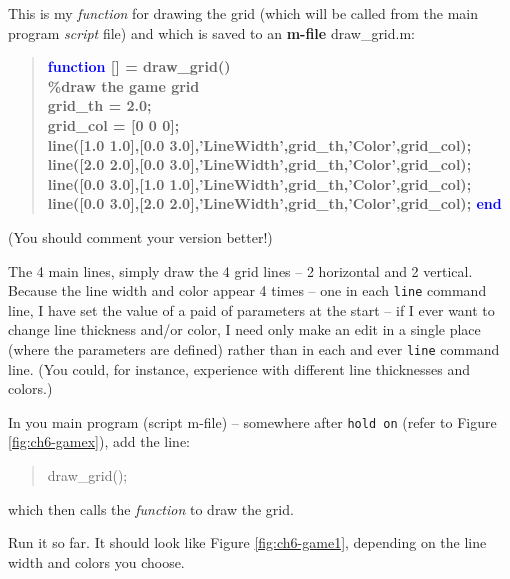 \documentclass{tufte-book} %
\newenvironment{docspec}{\begin{quotation}\ttfamily\parskip0pt\parindent0pt\ignorespaces}{\end{quotation}}
\newenvironment{docspecbold}{\begin{quotation}\ttfamily\bfseries\parskip0pt\parindent0pt\ignorespaces}{\end{quotation}}
\begin{document}
This is my \textit{function} for drawing the grid (which will be called from the main program \textit{script} file) and which is saved to an \textbf{m-file} \textsf{draw\_grid.m}:
\begin{docspecbold}
\textcolor{blue}{function} [] = draw\_grid()\\
\textcolor[rgb]{0,0.501961,0}{\%draw the game grid\\}
grid\_th = 2.0;\\
grid\_col = [0 0 0];\\
line([1.0 1.0],[0.0 3.0],\textcolor[rgb]{1,0,1}{'LineWidth'},grid\_th,\textcolor[rgb]{1,0,1}{'Color'},grid\_col);\\
line([2.0 2.0],[0.0 3.0],\textcolor[rgb]{1,0,1}{'LineWidth'},grid\_th,\textcolor[rgb]{1,0,1}{'Color'},grid\_col);\\
line([0.0 3.0],[1.0 1.0],\textcolor[rgb]{1,0,1}{'LineWidth'},grid\_th,\textcolor[rgb]{1,0,1}{'Color'},grid\_col);\\
line([0.0 3.0],[2.0 2.0],\textcolor[rgb]{1,0,1}{'LineWidth'},grid\_th,\textcolor[rgb]{1,0,1}{'Color'},grid\_col);
\textcolor{blue}{end}
\end{docspecbold}
(You should comment your version better!)

The 4 main lines, simply draw the 4 grid lines -- 2 horizontal and 2 vertical. Because the line width and color appear 4 times -- one in each \texttt{line} command line, I have set the value of a paid of parameters at the start -- if I ever want to change line thickness and/or color, I need only make an edit in a single place (where the parameters are defined) rather than in each and ever \texttt{line} command line. (You could, for instance, experience with different line thicknesses and colors.)

In you main program (script \textsf{m-file}) -- somewhere after \texttt{hold on} (refer to Figure \ref{fig:ch6-gamex}), add the line:
\begin{docspec}
draw\_grid();
\end{docspec}
which then calls the \textit{function} to draw the grid.

Run it so far. It should look like Figure \ref{fig:ch6-game1}, depending on the line width and colors you choose.
\end{document}
